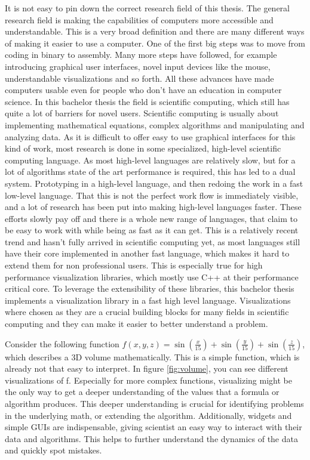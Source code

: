 It is not easy to pin down the correct research field of this thesis.
The general research field is making the capabilities of computers more accessible and understandable.
This is a very broad definition and there are many different ways of making it easier to use a computer. 
One of the first big steps was to move from coding in binary to assembly. 
Many more steps have followed, for example introducing graphical user interfaces, novel input devices like the mouse, understandable visualizations and so forth.
All these advances have made computers usable even for people who don't have an education in computer science.
In this bachelor thesis the field is scientific computing, which still has quite a lot of barriers for novel users.
Scientific computing is usually about implementing mathematical equations, complex algorithms and manipulating and analyzing data.
As it is difficult to offer easy to use graphical interfaces for this kind of work, most research is done in some specialized, high-level scientific computing language. As most high-level languages are relatively slow, but for a lot of algorithms state of the art performance is required, this has led to a dual system. Prototyping in a high-level language, and then redoing the work in a fast low-level language.
That this is not the perfect work flow is immediately visible, and a lot of research has been put into making high-level languages faster.
These efforts slowly pay off and there is a whole new range of languages, that claim to be easy to work with while being as fast as it can get.
This is a relatively recent trend and hasn't fully arrived in scientific computing yet, as most languages still have their core implemented in another fast language, which makes it hard to extend them for non professional users.
This is especially true for high performance visualization libraries, which mostly use C++ at their performance critical core.
To leverage the extensibility of these libraries, this bachelor thesis implements a visualization library in a fast high level language.
Visualizations where chosen as they are a crucial building blocks for many fields in scientific computing and they can make it easier to better understand a problem. 

Consider the following function $f(x,y,z)=\sin(\frac{x}{15})+\sin(\frac{y}{15})+\sin(\frac{z}{15})$, which describes a 3D volume mathematically. 
This is a simple function, which is already not that easy to interpret. In figure \ref{fig:volume}, you can see different visualizations of f. 
Especially for more complex functions, visualizing might be the only way to get a deeper understanding of the values that a formula or algorithm produces.
This deeper understanding is crucial for identifying problems in the underlying math, or extending the algorithm.
Additionally, widgets and simple \ac{GUI}s are indispensable, giving scientist an easy way to interact with their data and algorithms.
This helps to further understand the dynamics of the data and quickly spot mistakes.

